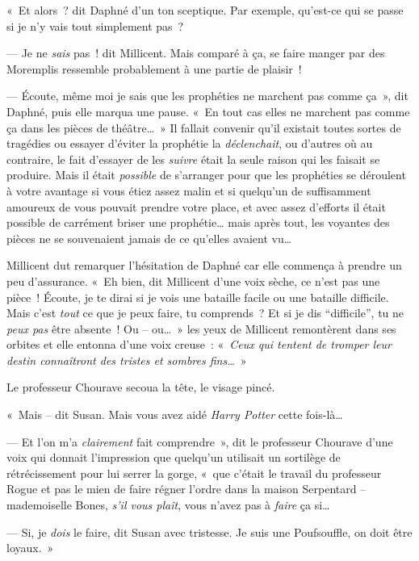 «~Et alors~? dit Daphné d'un ton sceptique. Par exemple, qu'est-ce qui se passe si je n'y vais tout simplement pas~?

--- Je ne \emph{sais} pas~! dit Millicent. Mais comparé à ça, se faire manger par des Moremplis ressemble probablement à une partie de plaisir~!

--- Écoute, même moi je sais que les prophéties ne marchent pas comme ça~», dit Daphné, puis elle marqua une pause. «~En tout cas elles ne marchent pas comme ça dans les pièces de théâtre…~» Il fallait convenir qu'il existait toutes sortes de tragédies ou essayer d'éviter la prophétie la \emph{déclenchait}, ou d'autres où au contraire, le fait d'essayer de les \emph{suivre} était la seule raison qui les faisait se produire. Mais il était \emph{possible} de s'arranger pour que les prophéties se déroulent à votre avantage si vous étiez assez malin et si quelqu'un de suffisamment amoureux de vous pouvait prendre votre place, et avec assez d'efforts il était possible de carrément briser une prophétie… mais après tout, les voyantes des pièces ne se souvenaient jamais de ce qu'elles avaient vu…

Millicent dut remarquer l'hésitation de Daphné car elle commença à prendre un peu d'assurance. «~Eh bien, dit Millicent d'une voix sèche, ce n'est pas une pièce~! Écoute, je te dirai si je vois une bataille facile ou une bataille difficile. Mais c'est \emph{tout} ce que je peux faire, tu comprends~? Et si je dis “difficile”, tu ne \emph{peux pas} être absente~! Ou -- ou…~» les yeux de Millicent remontèrent dans ses orbites et elle entonna d'une voix creuse~: «~\emph{Ceux qui tentent de tromper leur destin connaîtront des tristes et sombres fins…}~»

\later

Le professeur Chourave secoua la tête, le visage pincé.

«~Mais -- dit Susan. Mais vous avez aidé \emph{Harry Potter} cette fois-là…

--- Et l'on m'a \emph{clairement} fait comprendre~», dit le professeur Chourave d'une voix qui donnait l'impression que quelqu'un utilisait un sortilège de rétrécissement pour lui serrer la gorge, «~que c'était le travail du professeur Rogue et pas le mien de faire régner l'ordre dans la maison Serpentard -- mademoiselle Bones, \emph{s'il vous plaît}, vous n'avez pas à \emph{faire} ça si…

--- Si, je \emph{dois} le faire, dit Susan avec tristesse. Je suis une Poufsouffle, on doit être loyaux.~»

